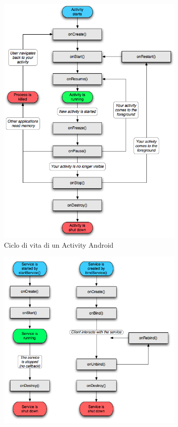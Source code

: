 \begin{figure}[H]
        \centering
        \begin{subfigure}[b]{0.49\textwidth}
			\includegraphics[width=\textwidth]{assets/android-activity.png}
			\caption{Ciclo di vita di un Activity Android}
			\label{fig:android-activity}
		\end{subfigure}
        \begin{subfigure}[b]{0.49\textwidth}
			\includegraphics[width=\textwidth]{assets/android-service.png}

\end{subfigure}
\end{figure}
